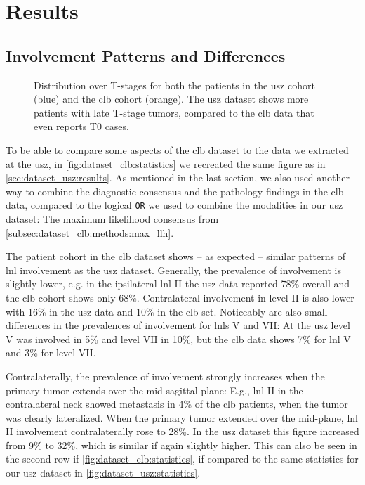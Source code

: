 \documentclass[\relativeRoot/main.tex]{subfiles}
\begin{document}
\section{Results}
\label{sec:dataset_clb:results}

\subsection*{Involvement Patterns and Differences}
\label{subsec:dataset_clb:results:patterns}

\begin{figure}
    \centering
    
    \caption[
        Comparison of T-stage distribution in \gls{usz} and \gls{clb} data
    ]{
        Distribution over T-stages for both the patients in the \gls{usz} cohort (blue) and the \gls{clb} cohort (orange). The \gls{usz} dataset shows more patients with late T-stage tumors, compared to the \gls{clb} data that even reports T0 cases.
    }
    \label{fig:dataset_clb:tstage_comp}
\end{figure}

To be able to compare some aspects of the \gls{clb} dataset to the data we extracted at the \gls{usz}, in \cref{fig:dataset_clb:statistics} we recreated the same figure as in \cref{sec:dataset_usz:results}. As mentioned in the last section, we also used another way to combine the diagnostic consensus and the pathology findings in the \gls{clb} data, compared to the logical \texttt{OR} we used to combine the modalities in our \gls{usz} dataset: The maximum likelihood consensus from \cref{subsec:dataset_clb:methods:max_llh}.

The patient cohort in the \gls{clb} dataset shows -- as expected -- similar patterns of \gls{lnl} involvement as the \gls{usz} dataset. Generally, the prevalence of involvement is slightly lower, e.g. in the ipsilateral \gls{lnl} II the \gls{usz} data reported 78\% overall and the \gls{clb} cohort shows only 68\%. Contralateral involvement in level II is also lower with 16\% in the \gls{usz} data and 10\% in the \gls{clb} set. Noticeably are also small differences in the prevalences of involvement for \glspl{lnl} V and VII: At the \gls{usz} level V was involved in 5\% and level VII in 10\%, but the \gls{clb} data shows 7\% for \gls{lnl} V and 3\% for level VII.

Contralaterally, the prevalence of involvement strongly increases when the primary tumor extends over the mid-sagittal plane: E.g., \gls{lnl} II in the contralateral neck showed metastasis in 4\% of the \gls{clb} patients, when the tumor was clearly lateralized. When the primary tumor extended over the mid-plane, \gls{lnl} II involvement contralaterally rose to 28\%. In the \gls{usz} dataset this figure increased from 9\% to 32\%, which is similar if again slightly higher. This can also be seen in the second row if \cref{fig:dataset_clb:statistics}, if compared to the same statistics for our \gls{usz} dataset in \cref{fig:dataset_usz:statistics}.
\end{document}
